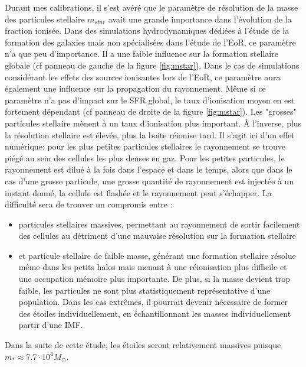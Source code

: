 Durant mes calibrations, il s'est avéré que le paramètre de résolution de la masse des particules stellaire $m_{star}$ avait une grande importance dans l'évolution de la fraction ionisée.
Dans des simulations hydrodynamiques dédiées à l'étude de la formation des galaxies mais non spécialisées dans l'étude de l'\ac{EoR}, ce paramètre n'a que peu d'importance.
Il a une faible influence sur la formation stellaire globale (cf panneau de gauche de la figure \ref{fig:mstar}).
Dans le cas de simulations considérant les effets des sources ionisantes lors de l'\ac{EoR}, ce paramètre aura également une influence sur la propagation du rayonnement.
Même si ce paramètre n'a pas d'impact sur le \ac{SFR} global, le taux d'ionisation moyen en est fortement dépendant (cf panneau de droite de la figure \ref{fig:mstar}).
Les "grosses" particules stellaire mènent à un taux d'ionisation plus important.
À l'inverse, plus la résolution stellaire est élevée, plus la boite réionise tard.
Il s'agit ici d'un effet numérique: pour les plus petites particules stellaires le rayonnement se trouve piégé au sein des cellules les plus denses en gaz.
Pour les petites particules, le rayonnement est dilué à la fois dans l'espace et dans le temps, alors que dans le cas d'une grosse particule, une grosse quantité de rayonnement est injectée à un instant donné, la cellule est flashée et le rayonnement peut s'échapper.
La difficulté sera de trouver un compromis entre :

\begin{itemize}
\item particules stellaires massives, permettant au rayonnement de sortir facilement des cellules au détriment d'une mauvaise résolution sur la formation stellaire
\item  et particule stellaire de faible masse, générant une formation stellaire résolue même dans les petits halos mais menant à une réionisation plus difficile et une occupation mémoire plus importante.
De plus, si la masse devient trop faible, les particules ne sont plus statistiquement représentative d'une population.
Dans les cas extrêmes, il pourrait devenir nécessaire de former des étoiles individuellement, en échantillonnant les masses individuellement partir d'une \ac{IMF}.
\end{itemize}

Dans la suite de cette étude, les étoiles seront relativement massives puisque $m_* \approx 7.7 \cdot 10^4 M_\odot$.


